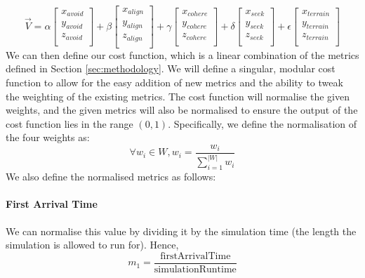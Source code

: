 \documentclass[12pt]{article}
\begin{document}
\begin{equation}
\vec{V} = 
\alpha
\begin{bmatrix}
    x_{avoid} \\
    y_{avoid} \\
    z_{avoid} \\
\end{bmatrix}
+ \beta
\begin{bmatrix}
    x_{align} \\
    y_{align} \\
    z_{align} \\
\end{bmatrix}
+ \gamma
\begin{bmatrix}
    x_{cohere} \\
    y_{cohere} \\
    z_{cohere} \\
\end{bmatrix}
+ \delta
\begin{bmatrix}
    x_{seek} \\
    y_{seek} \\
    z_{seek} \\
\end{bmatrix}
+ \epsilon
\begin{bmatrix}
    x_{terrain} \\
    y_{terrain} \\
    z_{terrain} \\
\end{bmatrix}
\end{equation}
We can then define our cost function, which is a linear combination of the metrics defined in Section \ref{sec:methodology}. We will define a singular, modular cost function to allow for the easy addition of new metrics and the ability to tweak the weighting of the existing metrics. The cost function will normalise the given weights, and the given metrics will also be normalised to ensure the output of the cost function lies in the range $(0,1)$. Specifically, we define the normalisation of the four weights as:
\begin{equation}
    \forall w_i \in W, w_i = \frac{w_i}{\sum_{i=1}^{|W|}{w_i}}
\end{equation}
We also define the normalised metrics as follows:

\paragraph{First Arrival Time}
We can normalise this value by dividing it by the simulation time (the length the simulation is allowed to run for). Hence,
\begin{equation}
    m_1 = \frac{\text{firstArrivalTime}}{\text{simulationRuntime}}
\end{equation}
\end{document}

